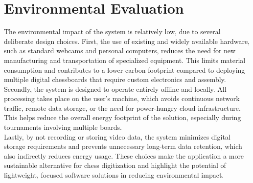 \section{Environmental Evaluation}
The environmental impact of the system is relatively low, due to several deliberate design choices. First, the use of existing and widely available hardware, such as standard webcams and personal computers, reduces the need for new manufacturing and transportation of specialized equipment. This limits material consumption and contributes to a lower carbon footprint compared to deploying multiple digital chessboards that require custom electronics and assembly. \\

Secondly, the system is designed to operate entirely offline and locally. All processing takes place on the user's machine, which avoids continuous network traffic, remote data storage, or the need for power-hungry cloud infrastructure. This helps reduce the overall energy footprint of the solution, especially during tournaments involving multiple boards. \\

Lastly, by not recording or storing video data, the system minimizes digital storage requirements and prevents unnecessary long-term data retention, which also indirectly reduces energy usage. These choices make the application a more sustainable alternative for chess digitization and highlight the potential of lightweight, focused software solutions in reducing environmental impact.
